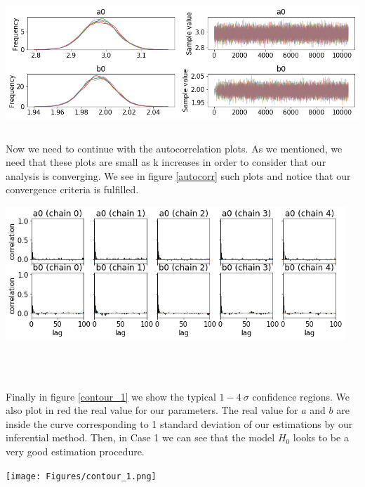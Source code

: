 \documentclass[onecolumn,           %
               showpacs,            %
               preprintnumbers,     %
               aps,                 %
               letterpaper,             %
               superscriptaddress,      %
               nofootinbib,         %
               tightenlines,        %
               floats,floatfix      %
               ,usenatbib,
               ]{revtex4-1}
\begin{document}
\begin{minipage}{\textwidth}
\centering
\includegraphics[height=5cm]{Figures/chain_new.png}
\label{chain}
\end{minipage}

Now we need to continue with the autocorrelation plots. As we mentioned, we need that these plots are small as k increases in order to consider that our analysis is converging. We see in figure \ref{autocorr} such plots and notice that our convergence criteria is fulfilled.

\begin{minipage}{\textwidth}
\centering
\includegraphics[height=5cm]{Figures/autocorr_1.png}
\label{autocorr}
\end{minipage}
\\$ $

Finally in figure \ref{contour_1} we show the typical $1-4\ \sigma$ confidence regions. We also plot in red the real value for our parameters. The real value for $a$ and $b$ are inside the curve corresponding to 1 standard deviation of our estimations by our inferential method. Then, in Case 1 we can see that the model $H_0$ looks to be a very good estimation procedure.

\begin{minipage}{\textwidth}
\centering
\texttt{[image: Figures/contour\_1.png]}
\label{contour_1}
\end{minipage}\\ $ $
\end{document}
